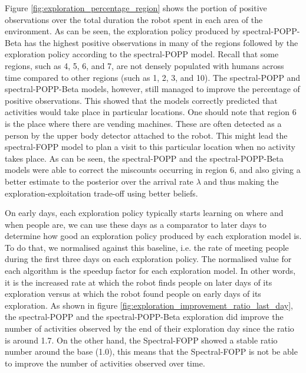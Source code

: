 Figure \ref{fig:exploration_percentage_region} shows the portion of positive observations over the total duration the robot spent in each area of the environment. As can be seen, the exploration policy produced by spectral-POPP-Beta has the highest positive observations in many of the regions followed by the exploration policy according to the spectral-POPP model. Recall that some regions, such as 4, 5, 6, and 7, are not densely populated with humans across time compared to other regions (such as 1, 2, 3, and 10). The spectral-POPP and spectral-POPP-Beta models, however, still managed to improve the percentage of positive observations. This showed that the models correctly predicted that activities would take place in particular locations. One should note that region 6 is the place where there are vending machines. These are often detected as a person by the upper body detector attached to the robot. This might lead the spectral-FOPP model to plan a visit to this particular location when no activity takes place. As can be seen, the spectral-POPP and the spectral-POPP-Beta models were able to correct the miscounts occurring in region 6, and also giving a better estimate to the posterior over the arrival rate $\lambda$ and thus making the exploration-exploitation trade-off using better beliefs.


On early days, each exploration policy typically starts learning on where and when people are, we can use these days as a comparator to later days to determine how good an exploration policy produced by each exploration model is. To do that, we normalised against this baseline, i.e. the rate of meeting people during the first three days on each exploration policy. The normalised value for each algorithm is the speedup factor for each exploration model. In other words, it is the increased rate at which the robot finds people on later days of its exploration versus at which the robot found people on early days of its exploration. As shown in figure \ref{fig:exploration_improvement_ratio_last_day}, the spectral-POPP and the spectral-POPP-Beta exploration did improve the number of activities observed by the end of their exploration day since the ratio is around 1.7. On the other hand, the Spectral-FOPP showed a stable ratio number around the base (1.0), this means that the Spectral-FOPP is not be able to improve the number of activities observed over time. 

